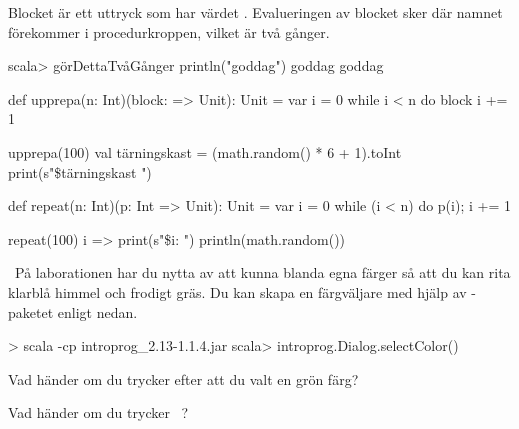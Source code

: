 \SOLUTION

\TaskSolved \what

\SubtaskSolved Blocket är ett uttryck som har värdet . Evalueringen av blocket sker där namnet  förekommer i procedurkroppen, vilket är två gånger.
\begin{REPL}
scala> görDettaTvåGånger { println("goddag") }
goddag
goddag
\end{REPL}

\SubtaskSolved
\begin{Code}
def upprepa(n: Int)(block: => Unit): Unit =
  var i = 0
  while i < n do
    block
    i += 1
\end{Code}

\SubtaskSolved
\begin{Code}
upprepa(100) {
  val tärningskast = (math.random() * 6 + 1).toInt
  print(s"\$tärningskast ")
}
\end{Code}


\SubtaskSolved
\begin{Code}
def repeat(n: Int)(p: Int => Unit): Unit = {
  var i = 0
  while (i < n) do
    p(i); i += 1
}
\end{Code}

\SubtaskSolved
\begin{Code}
repeat(100){ i =>
  print(s"\$i: ")
  println(math.random())
}
\end{Code}



\QUESTEND




\QUESTBEGIN

\Task \what~På laborationen har du nytta av att kunna blanda egna färger så att du kan rita klarblå himmel och frodigt gräs. Du kan skapa en färgväljare med hjälp av -paketet enligt nedan.
\begin{REPL}
> scala -cp introprog_2.13-1.1.4.jar
scala> introprog.Dialog.selectColor()
\end{REPL}

\Subtask Vad händer om du trycker  efter att du valt en grön färg?

\Subtask Vad händer om du trycker ~?

